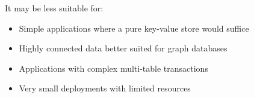 It may be less suitable for:
\begin{itemize}
  \item Simple applications where a pure key-value store would suffice
  \item Highly connected data better suited for graph databases
  \item Applications with complex multi-table transactions
  \item Very small deployments with limited resources
\end{itemize}
